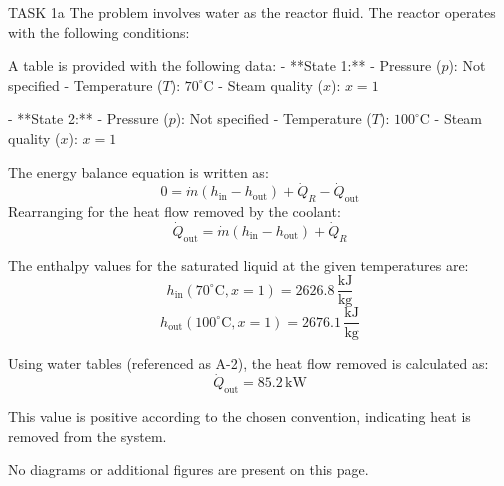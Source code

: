 TASK 1a  
The problem involves water as the reactor fluid. The reactor operates with the following conditions:  

A table is provided with the following data:  
- **State 1:**  
  - Pressure (\( p \)): Not specified  
  - Temperature (\( T \)): \( 70^\circ\text{C} \)  
  - Steam quality (\( x \)): \( x = 1 \)  

- **State 2:**  
  - Pressure (\( p \)): Not specified  
  - Temperature (\( T \)): \( 100^\circ\text{C} \)  
  - Steam quality (\( x \)): \( x = 1 \)  

The energy balance equation is written as:  
\[
0 = \dot{m} \left( h_{\text{in}} - h_{\text{out}} \right) + \dot{Q}_R - \dot{Q}_{\text{out}}
\]  
Rearranging for the heat flow removed by the coolant:  
\[
\dot{Q}_{\text{out}} = \dot{m} \left( h_{\text{in}} - h_{\text{out}} \right) + \dot{Q}_R
\]  

The enthalpy values for the saturated liquid at the given temperatures are:  
\[
h_{\text{in}}(70^\circ\text{C}, x = 1) = 2626.8 \, \frac{\text{kJ}}{\text{kg}}
\]  
\[
h_{\text{out}}(100^\circ\text{C}, x = 1) = 2676.1 \, \frac{\text{kJ}}{\text{kg}}
\]  

Using water tables (referenced as A-2), the heat flow removed is calculated as:  
\[
\dot{Q}_{\text{out}} = 85.2 \, \text{kW}
\]  

This value is positive according to the chosen convention, indicating heat is removed from the system.  

No diagrams or additional figures are present on this page.